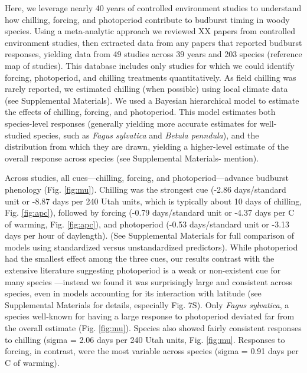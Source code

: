 \documentclass{article}
\begin{document}
\par Here, we leverage nearly 40 years of controlled environment studies to understand how chilling, forcing, and photoperiod contribute to budburst timing in woody species. Using a meta-analytic approach we reviewed XX papers from controlled environment studies, then extracted data from any papers that reported budburst responses, yielding data from 49 studies across 39 years and 203 species (reference map of studies). This database includes only studies for which we could identify forcing, photoperiod, and chilling treatments quantitatively. As field chilling was rarely reported, we estimated chilling (when possible) using local climate data (see Supplemental Materials). We used a Bayesian hierarchical model to estimate the effects of chilling, forcing, and photoperiod. This model estimates both species-level responses (generally yielding more accurate estimates for well-studied species, such as \emph{Fagus sylvatica} and \emph{Betula penndula}), and the distribution from which they are drawn, yielding a higher-level estimate of the overall response across species (see Supplemental Materials- mention).

\par Across studies, all cues---chilling, forcing, and photoperiod---advance budburst phenology (Fig. \ref {fig:mu}). Chilling was the strongest cue (-2.86 days/standard unit or -8.87 days per 240 Utah units, which is typically about 10 days of chilling, %
Fig. \ref {fig:apc}), followed by forcing (-0.79 days/standard unit or -4.37 days per \degree C of warming, Fig. \ref {fig:apc}), and photoperiod (-0.53 days/standard unit or -3.13 days per hour of daylength). (See Supplemental Materials for full comparison of models using standardized versus unstandardized predictors). While photoperiod had the smallest effect among the three cues, our results contrast with the extensive literature suggesting photoperiod is a weak or non-existent cue for many species \citep{zohner2016,koerner2010a}---instead we found it was surprisingly large and consistent across species, even in models accounting for its interaction with latitude (see Supplemental Materials for details, especially Fig. 7S). Only \emph{Fagus sylvatica}, a species well-known for having a large response to photoperiod deviated far from the overall estimate (Fig. \ref {fig:mu}). Species also showed fairly consistent responses to chilling (sigma = 2.06 days per 240 Utah units, Fig. \ref {fig:mu}.
Responses to forcing, in contrast, were the most variable across species (sigma = 0.91 days per \degree C of warming).
\end{document}
